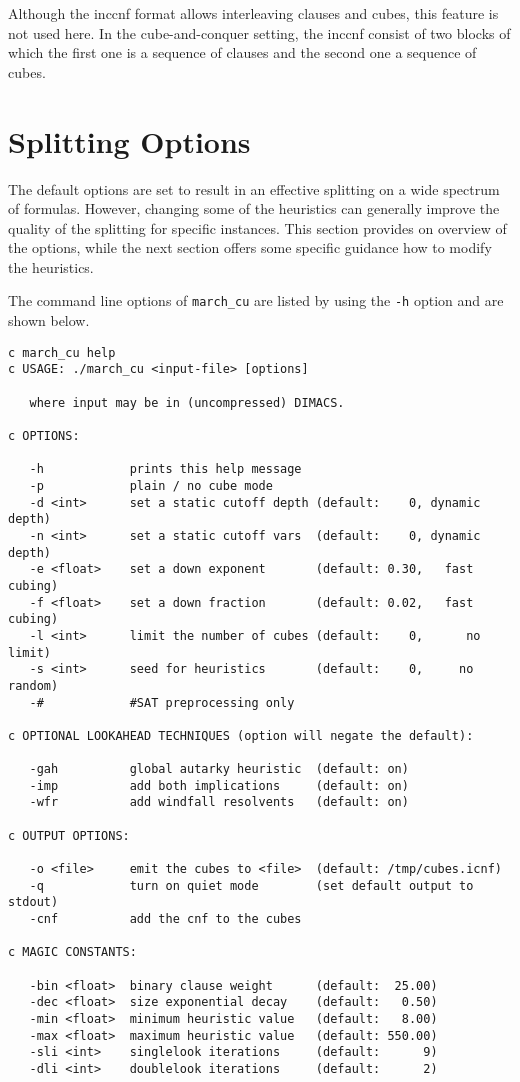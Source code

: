 \documentclass{llncs}
\begin{document}
Although the {\sc inccnf} format allows interleaving clauses and cubes, this feature is not used here. 
In the cube-and-conquer setting, the {\sc inccnf} consist of two blocks of which the first one
is a sequence of clauses and the second one a sequence of cubes. 

\section{Splitting Options}

The default options are set to result in an effective splitting on a wide
spectrum of formulas. However, changing some of the heuristics can
generally improve the quality of the splitting for specific instances. This
section provides on overview of the options, while the next section 
offers some specific guidance how to modify the heuristics. 

The command line options of {\tt march\_cu} are listed by using the {\tt -h} option
and are shown below. 


\begin{verbatim}
c march_cu help
c USAGE: ./march_cu <input-file> [options]

   where input may be in (uncompressed) DIMACS.

c OPTIONS:

   -h            prints this help message
   -p            plain / no cube mode
   -d <int>      set a static cutoff depth (default:    0, dynamic depth)
   -n <int>      set a static cutoff vars  (default:    0, dynamic depth)
   -e <float>    set a down exponent       (default: 0.30,   fast cubing)
   -f <float>    set a down fraction       (default: 0.02,   fast cubing)
   -l <int>      limit the number of cubes (default:    0,      no limit)
   -s <int>      seed for heuristics       (default:    0,     no random)
   -#            #SAT preprocessing only

c OPTIONAL LOOKAHEAD TECHNIQUES (option will negate the default):

   -gah          global autarky heuristic  (default: on)
   -imp          add both implications     (default: on)
   -wfr          add windfall resolvents   (default: on)

c OUTPUT OPTIONS:

   -o <file>     emit the cubes to <file>  (default: /tmp/cubes.icnf)
   -q            turn on quiet mode        (set default output to stdout)
   -cnf          add the cnf to the cubes

c MAGIC CONSTANTS:

   -bin <float>  binary clause weight      (default:  25.00)
   -dec <float>  size exponential decay    (default:   0.50)
   -min <float>  minimum heuristic value   (default:   8.00)
   -max <float>  maximum heuristic value   (default: 550.00)
   -sli <int>    singlelook iterations     (default:      9)
   -dli <int>    doublelook iterations     (default:      2)
\end{verbatim}
\end{document}
